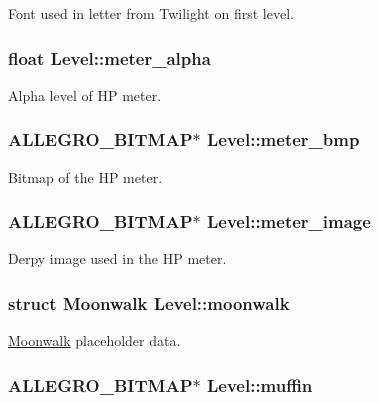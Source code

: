 Font used in letter from Twilight on first level. \hypertarget{structLevel_a246ce1ecf1523db218cf067df15e511f}{
\subsubsection[{meter\-\_\-alpha}]{\setlength{\rightskip}{0pt plus 5cm}float Level\-::meter\-\_\-alpha}}\label{structLevel_a246ce1ecf1523db218cf067df15e511f}
Alpha level of H\-P meter. \hypertarget{structLevel_a4e78a54cbf3cdcc804f65acb03cef0b3}{
\subsubsection[{meter\-\_\-bmp}]{\setlength{\rightskip}{0pt plus 5cm}A\-L\-L\-E\-G\-R\-O\-\_\-\-B\-I\-T\-M\-A\-P$\ast$ Level\-::meter\-\_\-bmp}}\label{structLevel_a4e78a54cbf3cdcc804f65acb03cef0b3}
Bitmap of the H\-P meter. \hypertarget{structLevel_a371c97dfa3d564a19648cb1b72edbf60}{
\subsubsection[{meter\-\_\-image}]{\setlength{\rightskip}{0pt plus 5cm}A\-L\-L\-E\-G\-R\-O\-\_\-\-B\-I\-T\-M\-A\-P$\ast$ Level\-::meter\-\_\-image}}\label{structLevel_a371c97dfa3d564a19648cb1b72edbf60}
Derpy image used in the H\-P meter. \hypertarget{structLevel_ab9e39b9ac0f342332e034c59d55d6a07}{
\subsubsection[{moonwalk}]{\setlength{\rightskip}{0pt plus 5cm}struct {\bf Moonwalk} Level\-::moonwalk}}\label{structLevel_ab9e39b9ac0f342332e034c59d55d6a07}
\hyperlink{structMoonwalk}{Moonwalk} placeholder data. \hypertarget{structLevel_ad4d4190d232b674d4211f3355a9b7a93}{
\subsubsection[{muffin}]{\setlength{\rightskip}{0pt plus 5cm}A\-L\-L\-E\-G\-R\-O\-\_\-\-B\-I\-T\-M\-A\-P$\ast$ Level\-::muffin}}\label{structLevel_ad4d4190d232b674d4211f3355a9b7a93}
